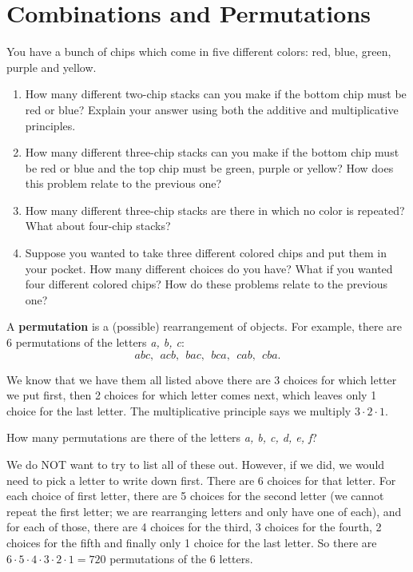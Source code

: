 \documentclass[11pt,]{book}
\newcommand{\terminology}[1]{\textbf{#1}}
\theoremstyle{ptxplainnotitle}
\theoremstyle{ptxplaintitle}
\theoremstyle{ptxdefinitionnotitle}
\theoremstyle{ptxdefinitiontitle}
\theoremstyle{ptxdefinitionnotitle}
\theoremstyle{ptxdefinitiontitle}
\theoremstyle{ptxdefinitionnotitle}
\theoremstyle{ptxdefinitiontitle}
\theoremstyle{ptxdefinitiontitlenonumber}
\theoremstyle{ptxdefinitiontitlenonumber}
\numberwithin{equation}{chapter}
\begin{document}
\section[{Combinations and Permutations}]{Combinations and Permutations}\label{sec_counting-combperm}
\begin{investigation}\label{investigation-13}
\hypertarget{p-1450}{}%
You have a bunch of chips which come in five different colors: red, blue, green, purple and yellow. %
\begin{enumerate}
\item\hypertarget{li-637}{}\hypertarget{p-1451}{}%
How many different two-chip stacks can you make if the bottom chip must be red or blue? Explain your answer using both the additive and multiplicative principles.%
\item\hypertarget{li-638}{}\hypertarget{p-1452}{}%
How many different three-chip stacks can you make if the bottom chip must be red or blue and the top chip must be green, purple or yellow? How does this problem relate to the previous one?%
\item\hypertarget{li-639}{}\hypertarget{p-1453}{}%
How many different three-chip stacks are there in which no color is repeated? What about four-chip stacks?%
\item\hypertarget{li-640}{}\hypertarget{p-1454}{}%
Suppose you wanted to take three different colored chips and put them in your pocket. How many different choices do you have? What if you wanted four different colored chips? How do these problems relate to the previous one?%
\end{enumerate}
%
\end{investigation}
\hypertarget{p-1455}{}%
A \terminology{permutation} is a (possible) rearrangement of objects. For example, there are 6 permutations of the letters \emph{a, b, c}:%
\begin{equation*}
abc, ~~ acb, ~~ bac, ~~bca, ~~ cab, ~~ cba.
\end{equation*}
%
\par
\hypertarget{p-1456}{}%
We know that we have them all listed above \textemdash{}there are 3 choices for which letter we put first, then 2 choices for which letter comes next, which leaves only 1 choice for the last letter. The multiplicative principle says we multiply \(3\cdot 2 \cdot 1\).%
\begin{example}\label{example-42}
\hypertarget{p-1457}{}%
How many permutations are there of the letters \emph{a, b, c, d, e, f}?%
\par\smallskip%
\noindent\textbf{}\hypertarget{solution-186}{}\hypertarget{p-1458}{}%
We do NOT want to try to list all of these out. However, if we did, we would need to pick a letter to write down first. There are 6 choices for that letter. For each choice of first letter, there are 5 choices for the second letter (we cannot repeat the first letter; we are rearranging letters and only have one of each), and for each of those, there are 4 choices for the third, 3 choices for the fourth, 2 choices for the fifth and finally only 1 choice for the last letter. So there are \(6 \cdot 5 \cdot 4 \cdot 3 \cdot 2 \cdot 1 = 720\) permutations of the 6 letters.%
\end{example}
\end{document}
